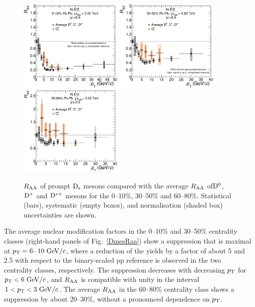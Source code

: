 \begin{figure}[!h]
\centering
\includegraphics[angle=0, width=0.45\textwidth]{FigCap5/DmesonAverageDs_010_.eps}
\includegraphics[angle=0, width=0.45\textwidth]{FigCap5/DmesonAverageDs_3050_.eps}
\includegraphics[angle=0, width=0.45\textwidth]{FigCap5/DmesonAverageDs_6080_.eps}
 \caption{$R_{\rm AA}$ 
  of prompt ${\rm D_s}$ mesons 
  compared with the average $R_{\rm AA}$ of${\rm D^0}$, ${\rm D^+}$ and ${\rm D^{*+}}$ mesons for the 
0--10\%, 30--50\% and 60--80\%. 
Statistical (bars),  systematic (empty boxes), and normalisation (shaded box) 
uncertainties are shown.}
 \label{fig:DmesRaa} 
\end{figure} 

\fi

The average nuclear modification factors in the 0--10\% 
and 30--50\% centrality classes (right-hand panels of 
Fig.~\ref{DmesRaa}) show a suppression that is
maximal at $p_{\rm T}=6$--$10~\mathrm{GeV}/c$, where a reduction of the yields by
a factor of about 5 and 2.5 with respect to the binary-scaled
 pp reference is observed in the two centrality classes, respectively.
The suppression decreases with decreasing $p_{\rm T}$ for $p_{\rm T}<6~\mathrm{GeV}/c$, and 
$R_{\rm AA}$ is compatible with unity  in the interval $1<p_{\rm T}<3~\mathrm{GeV}/c$.
The average $R_{\rm AA}$ in the 60--80\% centrality class shows a 
suppression by about 20--30\%, without a pronounced dependence on $p_{\rm T}$.

